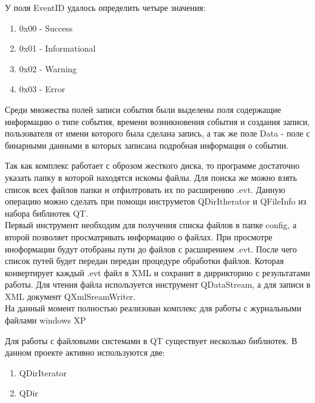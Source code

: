 У поля EventID удалось определить четыре значения: \\

\begin{enumerate}
\item 0x00 - Success
\item 0x01 - Informational
\item 0x02 - Warning
\item 0x03 - Error
\end{enumerate}

Среди множества полей записи события были выделены поля содержащие информацию о типе события, времени возникновения события и создания записи, пользователя от имени которого была сделана запись, а так же поле Data - поле с бинарными данными в которых записана подробная информация о событии. \\


Так как комплекс работает с оброзом жесткого диска, то программе достаточно указать папку в которой находятся искомы файлы. Для поиска же можно взять список всех файлов папки и отфилтровать их по расширению .evt. Данную операцию можно сделать при помощи инструметов QDirItherator и QFileInfo из набора библиотек QT. \\

Первый инструмент необходим для получения списка файлов в папке config, а второй позволяет просматривать информацию о файлах. При просмотре иноформации будут отобраны пути до файлов с расширением .evt. После чего список путей будет передан передан процедуре обработки файлов. Которая конвертирует каждый .evt файл в XML и сохранит в диррикторию с результатами работы. Для чтения файла используется инструмент QDataStream, а для записи в XML документ QXmlSreamWriter. \\ 


На данный момент полностью реализован комплекс для работы с журнальными файлами windows XP\\


Для работы с файловыми системами в QT существует несколько библиотек. В данном проекте активно используются две: \\

\begin{enumerate}
\item QDirIterator
\item QDir
\end{enumerate}

